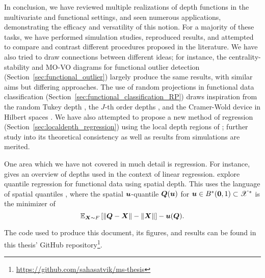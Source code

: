 

In conclusion, we have reviewed multiple realizations of depth functions in
the multivariate and functional settings, and seen numerous applications,
demonstrating the efficacy and versatility of this notion.
For a majority of these tasks, we have performed simulation studies,
reproduced results, and attempted to compare and contrast different procedures
proposed in the literature.
We have also tried to draw connections between different ideas; for instance,
the centrality-stability and MO-VO diagrams for functional outlier detection
(Section~\ref{sec:functional_outlier}) largely produce the same results, with
similar aims but differing approaches.
The use of random projections in functional data classification
(Section~\ref{sec:functional_classification_RP}) draws inspiration from the
random Tukey depth \parencite{albertos-reyes-2008a}, the $J$-th order depths
\parencite{nagy-gijbels-hlubinka-2017}, and the Cramer-Wold device in Hilbert
spaces \parencite{albertos-fraiman-ransford-2007}.
We have also attempted to propose a new method of regression
(Section~\ref{sec:localdepth_regression}) using the local depth regions of
\textcite{paindaveine-bever-2013}; further study into its theoretical
consistency as well as results from simulations are merited.

One area which we have not covered in much detail is regression.
For instance, \textcite{zuo-2021} gives an overview of depths used in the
context of linear regression.
\textcite{chowdhury-chaudhuri-2019} explore quantile regression for functional
data using spatial depth.
This uses the language of spatial quantiles
\parencite{chakraborty-chaudhuri-2014b}, where the spatial $\bm{u}$-quantile
$\bm{Q}(\bm{u})$ for $\bm{u} \in B^*(\bm{0}, 1) \subset \mathscr{X}^*$ is the
minimizer of
\begin{equation}
    \operatorname{\mathbb{E}}_{\bm{X} \sim F}\left[\Vert \bm{Q} - \bm{X} \Vert - \Vert \bm{X} \Vert\right] - \bm{u}(\bm{Q}).
\end{equation}

The code used to produce this document, its figures, and results can be found
in this thesis' GitHub
repository\footnote{\url{https://github.com/sahasatvik/ms-thesis}}.
